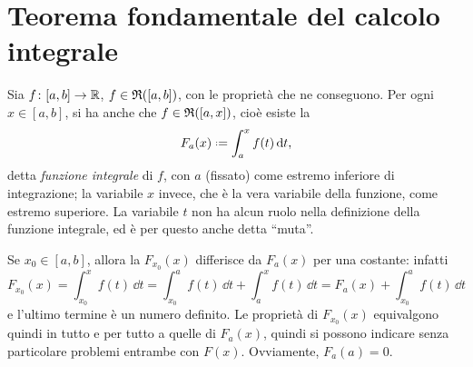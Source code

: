 \section{Teorema fondamentale del calcolo integrale}
\begin{definizione} \label{d:f-integrale}
Sia $f\colon[a,b]\to\mathbb{R}$, $f\in\mathfrak{R}([a,b])$, con le proprietà che ne conseguono. Per ogni $x\in[a,b]$, si ha anche che $f\in\mathfrak{R}([a,x])$, cioè esiste la
\[
F_a(x)\defeq\int_a^xf(t)\,\dd t,
\]
detta \emph{funzione integrale} di $f$, con $a$ (fissato) come estremo inferiore di integrazione; la variabile $x$ invece, che è la vera variabile della funzione, come estremo superiore. La variabile $t$ non ha alcun ruolo nella definizione della funzione integrale, ed è per questo anche detta ``muta''.
\end{definizione}
Se $x_0\in[a,b]$, allora la $F_{x_0}(x)$ differisce da $F_a(x)$ per una costante: infatti
\[
F_{x_0}(x)=\int_{x_0}^xf(t)\,\dd t=\int_{x_0}^af(t)\,\dd t+\int_a^xf(t)\,\dd t=F_a(x)+\int_{x_0}^af(t)\,\dd t
\]
e l'ultimo termine è un numero definito.
Le proprietà di $F_{x_0}(x)$ equivalgono quindi in tutto e per tutto a quelle di $F_a(x)$, quindi si possono indicare senza particolare problemi entrambe con $F(x)$.
Ovviamente, $F_a(a)=0$.

